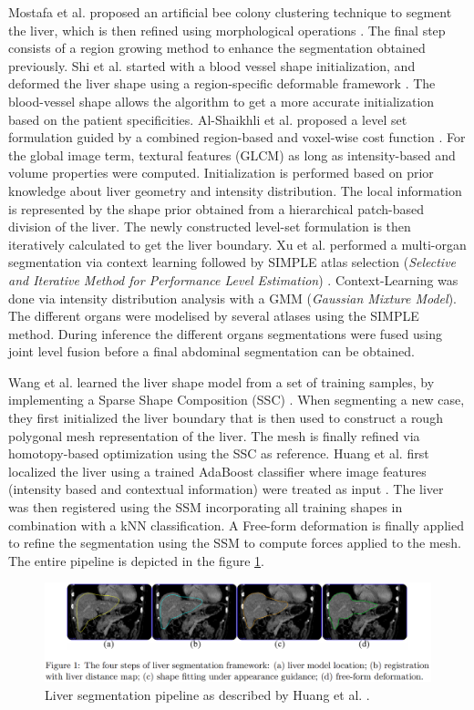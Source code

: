 \documentclass[]{article}
\begin{document}
Mostafa et al. proposed an artificial bee colony clustering technique to
segment the liver, which is then refined using morphological operations \cite{Mostofa2015}.
The final step consists of a region growing method to enhance the
segmentation obtained previously.
Shi et al. started with a blood vessel shape initialization, and deformed
the liver shape using a region-specific deformable framework \cite{Shi2015}. The
blood-vessel shape allows the algorithm to get a more accurate
initialization based on the patient specificities. Al-Shaikhli et al. proposed a level set formulation guided by a combined region-based and
voxel-wise cost function \cite{Al-Shaikhli2015}. For the global image term, textural features
(GLCM) as long as intensity-based and volume properties were computed.
Initialization is performed based on prior knowledge about liver
geometry and intensity distribution. The local information is
represented by the shape prior obtained from a hierarchical patch-based
division of the liver. The newly constructed level-set formulation is
then iteratively calculated to get the liver boundary.
Xu et al. performed a multi-organ segmentation via context learning
followed by SIMPLE atlas selection (\emph{Selective and Iterative Method
	for Performance Level Estimation}) \cite{Xu2015}. Context-Learning was done via
intensity distribution analysis with a GMM (\emph{Gaussian Mixture
	Model}). The different organs were modelised by several atlases using
the SIMPLE method. During inference the different organs segmentations
were fused using joint level fusion before a final abdominal
segmentation can be obtained.

Wang et al. learned the liver shape model from a set of training
samples, by implementing a Sparse Shape Composition (SSC) \cite{Wang2015b}. When
segmenting a new case, they first initialized the liver boundary that is
then used to construct a rough polygonal mesh representation of the
liver. The mesh is finally refined via homotopy-based optimization using
the SSC as reference.
Huang et al. first localized the liver using a trained AdaBoost
classifier where image features (intensity based and contextual
information) were treated as input \cite{Huang2014}. The liver was then registered using
the SSM incorporating all training shapes in combination with a kNN
classification. A Free-form deformation is finally applied to refine the
segmentation using the SSM to compute forces applied to the mesh. The
entire pipeline is depicted in the figure \ref{Huang2014_Fig1}.

\begin{figure}[th!]
	\centering
	\includegraphics[width=0.7\linewidth]{images/image9}
	\caption{Liver segmentation pipeline as described by Huang et al. \cite{Huang2014}.}
	\label{Huang2014_Fig1}
\end{figure}
\end{document}
